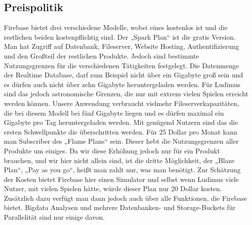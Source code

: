 \subsection{Preispolitik}
Firebase bietet drei verschiedene Modelle, wobei eines kostenlos ist und die restlichen beiden kostenpflichtig sind. 
Der „Spark Plan“ ist die gratis Version. Man hat Zugriff auf Datenbank, Fileserver, Website Hosting, Authentifizierung und den Großteil der restlichen Produkte. Jedoch sind bestimmte Nutzungsgrenzen für die verschiedenen Tätigkeiten festgelegt. Die Datenmenge der Realtime Database, darf zum Beispiel nicht über ein Gigabyte groß sein und es dürfen auch nicht über zehn Gigabyte heruntergeladen werden. Für Ludimus sind das jedoch astronomische Grenzen, die nur mit extrem vielen Spielen erreicht werden können. Unsere Anwendung verbraucht vielmehr Fileserverkapazitäten, die bei diesem Modell bei fünf Gigabyte liegen und es dürfen maximal ein Gigabyte pro Tag heruntergeladen werden. Mit genügend Nutzern sind das die ersten Schwellpunkte die überschritten werden. 
Für 25 Dollar pro Monat kann man Subscriber des „Flame Plans“ sein. Dieser hebt die Nutzungsgrenzen aller Produkte um einiges.
 Da wir diese Erhöhung jedoch nur für ein Produkt brauchen, und wir hier nicht allein sind, ist die dritte Möglichkeit, der „Blaze Plan“, „Pay as you go“, heißt man zahlt nur, was man benötigt. Zur Schätzung der Kosten bietet Firebase hier einen Simulator und selbst wenn Ludimus viele Nutzer, mit vielen Spielen hätte, würde dieser Plan nur 20 Dollar kosten. Zusätzlich dazu verfügt man dann jedoch auch über alle Funktionen, die Firebase bietet. Bigdata Analysen und mehrere Datenbanken- und Storage-Buckets für Parallelität sind nur einige davon.
